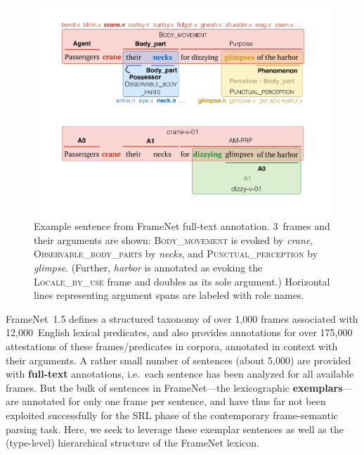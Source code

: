 \documentclass[11pt,a4paper]{article}
\newcommand{\fnf}[1]{\textsc{\textsf{#1}}} %
\begin{document}
\begin{figure}
\includegraphics[width=\columnwidth]{fig/harbor-fn.pdf}
\caption{Example sentence from FrameNet full-text annotation. 
3~frames and their arguments are shown: 
\fnf{Body\_movement} is evoked by \textit{crane},
\fnf{Observable\_body\_parts} by \textit{necks}, 
and \fnf{Punctual\_perception} by \textit{glimpse}.
(Further, \textit{harbor} is annotated as evoking the \fnf{Locale\_by\_use} frame 
and doubles as its sole argument.) 
Horizontal lines representing argument spans 
are labeled with role names.}
\label{fig:harbor-fn}
\end{figure}

FrameNet~1.5 defines a structured taxonomy of over 1,000 frames associated with 12,000~English lexical predicates, 
and also provides annotations for over 175,000 attestations 
of these frames/predicates in corpora, annotated in context with their arguments. 
A rather small number of sentences (about 5,000)
are provided with \textbf{full-text} annotations, i.e.~each sentence 
has been analyzed for all available frames. 
But the bulk of sentences in FrameNet---the lexicographic \textbf{exemplars}---are annotated for only one frame per sentence, 
and have thus far not been exploited successfully for the SRL phase of the contemporary frame-semantic parsing task.
Here, we seek to leverage these exemplar sentences 
as well as the (type-level) hierarchical structure of the FrameNet lexicon. 
\end{document}

